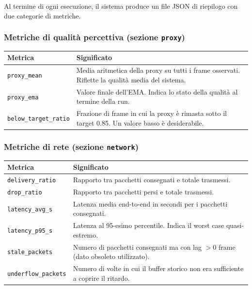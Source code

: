 \documentclass[12pt,a4paper]{article}
\begin{document}
Al termine di ogni esecuzione, il sistema produce un file JSON di riepilogo con due
categorie di metriche.

\subsubsection{Metriche di qualit\`a percettiva (sezione \texttt{proxy})}

\begin{center}
\begin{tabular}{@{}L{3.5cm}L{9cm}@{}}
  \toprule
  Metrica & Significato \\
  \midrule
  \texttt{proxy\_mean} & Media aritmetica della proxy su tutti i frame osservati.
                         Riflette la qualit\`a media del sistema. \\[4pt]
  \texttt{proxy\_ema} & Valore finale dell'EMA. Indica lo stato della qualit\`a
                        al termine della run. \\[4pt]
  \texttt{below\_target\_ratio} & Frazione di frame in cui la proxy \`e rimasta sotto
                                   il target 0.85. Un valore basso \`e desiderabile. \\
  \bottomrule
\end{tabular}
\end{center}

\subsubsection{Metriche di rete (sezione \texttt{network})}

\begin{center}
\begin{tabular}{@{}L{3.8cm}L{8.7cm}@{}}
  \toprule
  Metrica & Significato \\
  \midrule
  \texttt{delivery\_ratio} & Rapporto tra pacchetti consegnati e totale trasmessi. \\[4pt]
  \texttt{drop\_ratio} & Rapporto tra pacchetti persi e totale trasmessi. \\[4pt]
  \texttt{latency\_avg\_s} & Latenza media end-to-end in secondi per i pacchetti consegnati. \\[4pt]
  \texttt{latency\_p95\_s} & Latenza al 95-esimo percentile. Indica il worst case
                              quasi-estremo. \\[4pt]
  \texttt{stale\_packets} & Numero di pacchetti consegnati ma con lag $> 0$ frame
                            (dato obsoleto utilizzato). \\[4pt]
  \texttt{underflow\_packets} & Numero di volte in cui il buffer storico non era
                                 sufficiente a coprire il ritardo. \\
  \bottomrule
\end{tabular}
\end{center}
\end{document}
